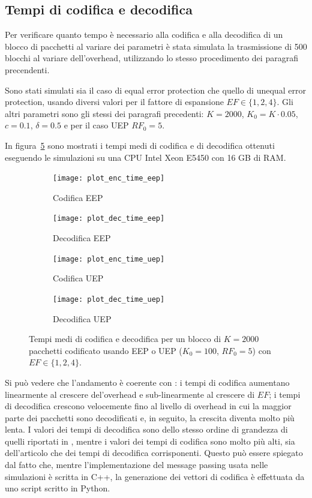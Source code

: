 \documentclass[italian, a4paper, 12pt]{article}
\begin{document}
\subsection{Tempi di codifica e decodifica}
Per verificare quanto tempo è necessario alla codifica e alla
decodifica di un blocco di pacchetti al variare dei parametri è stata
simulata la trasmissione di 500 blocchi al variare dell'overhead,
utilizzando lo stesso procedimento dei paragrafi precendenti.

Sono stati simulati sia il caso di equal error protection che quello
di unequal error protection, usando diversi valori per il fattore di
espansione $EF \in \{ 1,2,4 \}$. Gli altri parametri sono gli stessi
dei paragrafi precedenti: $K = 2000$, $K_0 = K \cdot 0.05$, $c=0.1$,
$\delta=0.5$ e per il caso UEP $RF_0 = 5$.

In figura~\ref{fig:encdec} sono mostrati i tempi medi di codifica e di
decodifica ottenuti eseguendo le simulazioni su una CPU Intel Xeon
E5450 con 16 GB di RAM.
%
\begin{figure}[htb]
  \centering
  \begin{subfigure}{0.5\textwidth}
    \centering
    \texttt{[image: plot\_enc\_time\_eep]}
    \caption{Codifica EEP}
    \label{fig:enctime_eep}
  \end{subfigure}%
  \begin{subfigure}{0.5\textwidth}
    \centering
    \texttt{[image: plot\_dec\_time\_eep]}
    \caption{Decodifica EEP}
    \label{fig:dectime_eep}
  \end{subfigure}
  \begin{subfigure}{0.5\textwidth}
    \centering
    \texttt{[image: plot\_enc\_time\_uep]}
    \caption{Codifica UEP}
    \label{fig:enctime_uep}
  \end{subfigure}%
  \begin{subfigure}{0.5\textwidth}
    \centering
    \texttt{[image: plot\_dec\_time\_uep]}
    \caption{Decodifica UEP}
    \label{fig:dectime_uep}
  \end{subfigure}
  \caption{Tempi medi di codifica e decodifica per un blocco di
    $K=2000$ pacchetti codificato usando EEP o UEP ($K_0 = 100$,
    $RF_0=5$) con $EF \in \{1,2,4\}$.}
  \label{fig:encdec}
\end{figure}
%
Si può vedere che l'andamento è coerente con \cite{uep}: i tempi di
codifica aumentano linearmente al crescere del'overhead e
sub-linearmente al crescere di $EF$; i tempi di decodifica crescono
velocemente fino al livello di overhead in cui la maggior parte dei
pacchetti sono decodificati e, in seguito, la crescita diventa molto
più lenta.
%
I valori dei tempi di decodifica sono dello stesso ordine di grandezza
di quelli riportati in \cite{uep}, mentre i valori dei tempi di
codifica sono molto più alti, sia dell'articolo che dei tempi di
decodifica corrisponenti. Questo può essere spiegato dal fatto che,
mentre l'implementazione del message passing usata nelle simulazioni è
scritta in C++, la generazione dei vettori di codifica è effettuata da
uno script scritto in Python.
\end{document}
